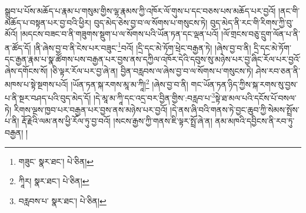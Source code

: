 སྒྲུབ་པ་པོས་མཆོད་པ་རྣམ་པ་གསུམ་གྱིས་ལྷ་རྣམས་ཀྱི་འཁོར་ལོ་གུས་པ་དང་བཅས་པས་མཆོད་པར་བྱའོ། །ནང་གི་མཆོད་པ་བསྟན་པར་བྱ་བའི་ཕྱིར། བུད་མེད་ཅེས་བྱ་བ་ལ་སོགས་པ་གསུངས་ཏེ། བུད་མེད་ནི་རང་གི་རིགས་ཀྱི་བུ་མོའོ། །མདངས་བཟང་བ་ནི་གཟུགས་སྡུག་པ་ལ་སོགས་པའི་ཡོན་ཏན་དང་ལྡན་པའོ། །ལོ་གྲངས་བཅུ་དྲུག་ལོན་པ་ནི་ན་ཚོད་དོ། །ནི་ཞེས་བྱ་བ་ནི་ངེས་པར་བཟུང་\footnote{གཟུང་  སྣར་ཐང་།  པེ་ཅིན། }བའོ། །དྲི་དང་མེ་ཏོག་ཕྲེང་བརྒྱན་ཏེ། །ཞེས་བྱ་བ་ནི། དྲི་དང་མེ་ཏོག་དང་རྒྱན་རྣམ་པ་སྣ་ཚོགས་པས་བརྒྱན་པར་བྱས་ནས་དཀྱིལ་འཁོར་དེའི་དབུས་སུ་མཉེས་པར་བྱ་ཞིང་རོལ་པར་བྱའོ་ཞེས་དགོངས་སོ། །ཅི་ལྟར་རོལ་པར་བྱ་ཞེ་ན། བྱིན་བརླབས་ལ་ཞེས་བྱ་བ་ལ་སོགས་པ་གསུངས་ཏེ། ཤེས་རབ་ཅན་ནི་མཁས་པ་སྟེ་སྔགས་པའོ། །ཡོན་ཏན་སྐ་རགས་མཱ་མ་ཀཱི།\footnote{ཀཱིར།  སྣར་ཐང་།  པེ་ཅིན། } །ཞེས་བྱ་བ་ནི། གང་ཡོན་ཏན་ཉིད་ཀྱིས་སྐ་རགས་སུ་བྱས་པ་ནི་སྔར་བཤད་པའི་བུད་མེད་དོ། །དེ་མཱ་མ་ཀཱི་དང་འདྲ་བར་བྱིན་གྱིས་:བརླབ་པ་\footnote{བརླབས་པ་  སྣར་ཐང་།  པེ་ཅིན། }སྟེ་ཐ་མལ་པའི་དངོས་པོ་བསལ་ཏེ། རིགས་ལྔས་ཁྱབ་པར་བརྒྱན་པར་བྱས་ནས་མཉེས་པར་བྱའོ། །དེ་ནས་ཞི་བའི་གནས་ཏེ་བྱང་ཆུབ་ཀྱི་སེམས་སྤྲོས་པ་ནི། རྡོ་རྗེའི་ལམ་ནས་ཕྱི་རོལ་ཏུ་བྱ་བའོ། །སངས་རྒྱས་ཀྱི་གནས་ཇི་ལྟར་སྤྲོ་ཞེ་ན། ནམ་མཁའི་དབྱིངས་ནི་རབ་ཏུ་བརྒྱན། །
